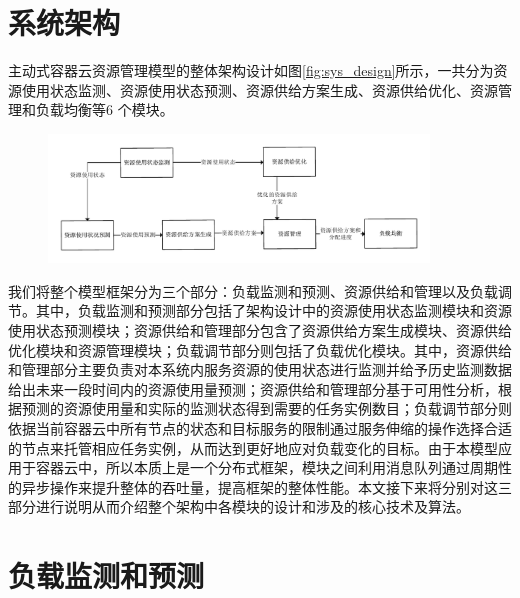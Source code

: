 \section{系统架构}
主动式容器云资源管理模型的整体架构设计如图\ref{fig:sys_design}所示，一共分为资源使用状态监测、资源使用状态预测、资源供给方案生成、资源供给优化、资源管理和负载均衡等6 个模块。
\begin{figure}[H]
\centering
\includegraphics[width=0.9\textwidth]{./figure/sys_design}
\end{figure}

我们将整个模型框架分为三个部分：负载监测和预测、资源供给和管理以及负载调节。其中，负载监测和预测部分包括了架构设计中的资源使用状态监测模块和资源使用状态预测模块；资源供给和管理部分包含了资源供给方案生成模块、资源供给优化模块和资源管理模块；负载调节部分则包括了负载优化模块。其中，资源供给和管理部分主要负责对本系统内服务资源的使用状态进行监测并给予历史监测数据给出未来一段时间内的资源使用量预测；资源供给和管理部分基于可用性分析，根据预测的资源使用量和实际的监测状态得到需要的任务实例数目；负载调节部分则依据当前容器云中所有节点的状态和目标服务的限制通过服务伸缩的操作选择合适的节点来托管相应任务实例，从而达到更好地应对负载变化的目标。由于本模型应用于容器云中，所以本质上是一个分布式框架，模块之间利用消息队列通过周期性的异步操作来提升整体的吞吐量，提高框架的整体性能。本文接下来将分别对这三部分进行说明从而介绍整个架构中各模块的设计和涉及的核心技术及算法。

\section{负载监测和预测}
